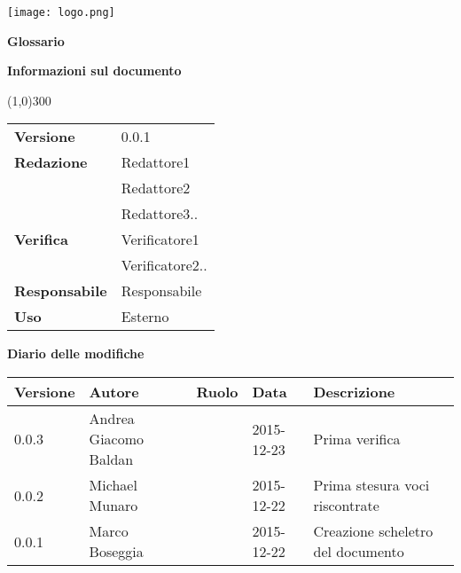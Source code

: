 \documentclass{scalatekids-article}
\begin{document}
\begin{titlepage}
  \centering
  \texttt{[image: logo.png]}\par\vspace{1cm}
  \vspace{1.5cm}
         {\Huge\bfseries Glossario \par}
         \begin{center}
           \vspace{1.0cm}
                  {\large\bfseries Informazioni sul documento \par}
         \end{center}
         \vspace{-1cm}
         \begin{center}
           \line(1,0){300}
         \end{center}
         \vspace{0cm}
         \begin{tabular}[c]{l|l}
           \textbf{Versione} & 0.0.1\\
           \textbf{Redazione} & Redattore1\\ & Redattore2\\ & Redattore3..\\
           \textbf{Verifica} & Verificatore1\\ & Verificatore2..\\
           \textbf{Responsabile} & Responsabile\\
           \textbf{Uso} & Esterno
         \end{tabular}
\end{titlepage}
\clearpage
\setcounter{page}{1}
\begin{flushleft}
  \vspace{0cm}
         {\large\bfseries Diario delle modifiche \par}
\end{flushleft}
\vspace{0cm}
\begin{center}
  \begin{tabular}{|l | l | l | l | l |}
    \hline
    Versione & Autore & Ruolo & Data & Descrizione \\
    \hline
    0.0.3 & Andrea Giacomo Baldan & & 2015-12-23 & Prima verifica\\
    \hline
    0.0.2 & Michael Munaro & & 2015-12-22 & Prima stesura voci riscontrate\\
    \hline
    0.0.1 & Marco Boseggia & & 2015-12-22 & Creazione scheletro del documento\\
    \hline
  \end{tabular}
\end{center}
\end{document}
